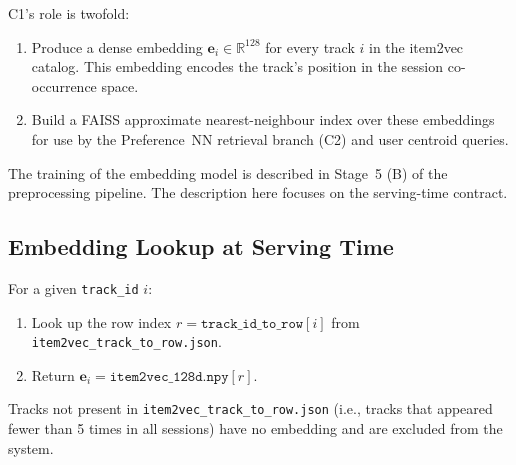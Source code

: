 \documentclass[11pt]{article}
\begin{document}
C1's role is twofold:
\begin{enumerate}
  \item Produce a dense embedding $\mathbf{e}_i \in \mathbb{R}^{128}$
        for every track $i$ in the item2vec catalog.
        This embedding encodes the track's position in the
        session co-occurrence space.
  \item Build a FAISS approximate nearest-neighbour index over these
        embeddings for use by the Preference~NN retrieval branch (C2)
        and user centroid queries.
\end{enumerate}

The training of the embedding model is described in Stage~5 (B) of
the preprocessing pipeline. The description here focuses on the
serving-time contract.

\subsection{Embedding Lookup at Serving Time}

For a given \texttt{track\_id} $i$:
\begin{enumerate}
  \item Look up the row index $r = \texttt{track\_id\_to\_row}[i]$
        from \texttt{item2vec\_track\_to\_row.json}.
  \item Return $\mathbf{e}_i = \texttt{item2vec\_128d.npy}[r]$.
\end{enumerate}

Tracks not present in \texttt{item2vec\_track\_to\_row.json}
(i.e., tracks that appeared fewer than 5 times in all sessions)
have no embedding and are excluded from the system.



\end{document}
